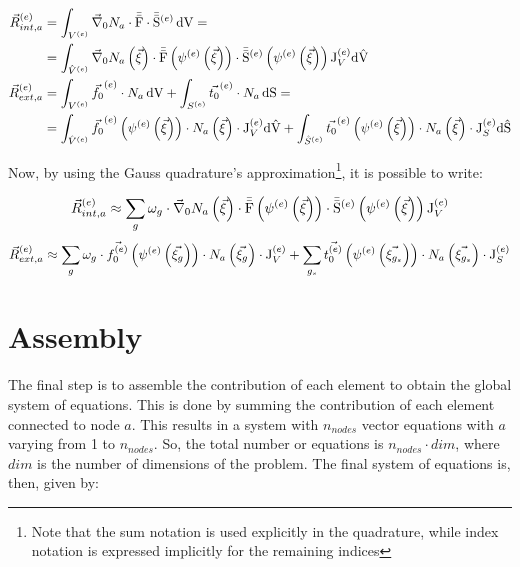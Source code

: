 \begin{align*}
    \vec{R}_{int,a}^{(e)} &= \int_{V^{(e)}} \vec{\nabla}_\mathrm{0} N_a \cdot \bar{\bar{\mathrm{F}}} \cdot \bar{\bar{\mathrm{S}}}^{(e)} \, \mathrm{dV} = \\
    &= \int_{\hat V^{(e)}} \vec{\nabla}_\mathrm{0} N_a \left(\vec{\xi} \right) \cdot \bar{\bar{\mathrm{F}}} \left(\psi^{(e)}\left(\vec{\xi}\right)\right) \cdot \bar{\bar{\mathrm{S}}}^{(e)} \left(\psi^{(e)}\left(\vec{\xi}\right)\right) \mathrm{J}_V^{(e)} \mathrm{d\hat V} \\
    \vec{R}_{ext,a}^{(e)} &= \int_{V^{(e)}} \vec{f_0}^{(e)} \cdot N_a  \, \mathrm{dV} + \int_{S^{(e)}} \vec{t_0}^{(e)} \cdot N_a \, \mathrm{dS} = \\
    &= \int_{\hat{V}^{(e)}} \vec{f_0}^{(e)} \left(\psi^{(e)}\left(\vec{\xi}\right)\right) \cdot N_a \left(\vec{\xi} \right) \cdot \mathrm{J}_V^{(e)} \mathrm{d\hat V} + \int_{\hat{S}^{(e)}} \vec{t_0}^{(e)} \left(\psi^{(e)}\left(\vec{\xi}\right)\right) \cdot N_a \left(\vec{\xi} \right) \cdot \mathrm{J}_S^{(e)} \mathrm{d\hat S}
\end{align*}

Now, by using the Gauss quadrature's approximation\footnote{Note that the sum notation is used explicitly in the quadrature, while index notation is expressed implicitly for the remaining indices}, it is possible to write:

\begin{equation} \label{eq:integral_Rint}
    \vec{R}_{int,a}^{(e)} \approx \sum_g \omega_g \cdot \vec{\nabla}_\mathrm{0} N_a \left(\vec{\xi} \right) \cdot \bar{\bar{\mathrm{F}}} \left(\psi^{(e)}\left(\vec{\xi}\right)\right) \cdot \bar{\bar{\mathrm{S}}}^{(e)} \left(\psi^{(e)}\left(\vec{\xi}\right)\right) \mathrm{J}_V^{(e)}
\end{equation}
\begin{equation} \label{eq:integral_Rext}
    \vec{R}_{ext,a}^{(e)} \approx \sum_g \omega_g \cdot \vec{f_0^{(e)}} \left(\psi^{(e)}\left(\vec{\xi_g} \right) \right) \cdot N_a \left(\vec{\xi_g}\right) \cdot \mathrm{J}_V^{(e)} + \sum_{g_s} \vec{t_0^{(e)}} \left(\psi^{(e)}\left(\vec{\xi_{g_s}} \right) \right) \cdot N_a \left(\vec{\xi_{g_s}}\right) \cdot \mathrm{J}_S^{(e)}
\end{equation}

\section{Assembly} \label{sec:4-assembly}

The final step is to assemble the contribution of each element to obtain the global system of equations. This is done by summing the contribution of each element connected to node $a$. This results in a system with $n_{nodes}$  vector equations with $a$ varying from 1 to $n_{nodes}$. So, the total number or equations is $n_{nodes} \cdot dim$, where $dim$ is the number of dimensions of the problem. The final system of equations is, then, given by:

